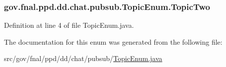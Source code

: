 \hypertarget{enumgov_1_1fnal_1_1ppd_1_1dd_1_1chat_1_1pubsub_1_1TopicEnum_ad9de979f98663978fba2a422ea93e9d6}{
\subsubsection[{Topic\-Two}]{\setlength{\rightskip}{0pt plus 5cm}gov.\-fnal.\-ppd.\-dd.\-chat.\-pubsub.\-Topic\-Enum.\-Topic\-Two}}\label{enumgov_1_1fnal_1_1ppd_1_1dd_1_1chat_1_1pubsub_1_1TopicEnum_ad9de979f98663978fba2a422ea93e9d6}


Definition at line 4 of file Topic\-Enum.\-java.



The documentation for this enum was generated from the following file\-:\begin{DoxyCompactItemize}
\item 
src/gov/fnal/ppd/dd/chat/pubsub/\hyperlink{TopicEnum_8java}{Topic\-Enum.\-java}\end{DoxyCompactItemize}

